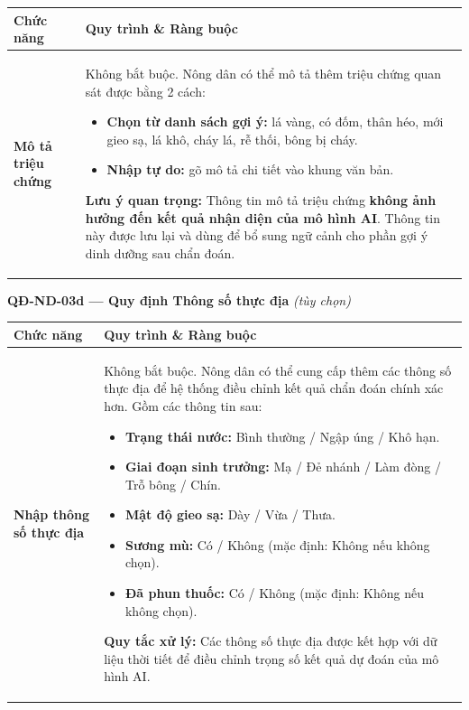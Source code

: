 \documentclass[12pt,a4paper]{article}
\begin{document}
\begin{longtable}{|
        >{\raggedright\arraybackslash}p{2.8cm}|
        >{\raggedright\arraybackslash}p{12cm}|}
    \hline
    \rowcolor{headerblue}
    \textbf{Chức năng}         & \textbf{Quy trình \& Ràng buộc}                                                                                                                                                          \\
    \hline
    \endhead
    \textbf{Mô tả triệu chứng} &
    Không bắt buộc. Nông dân có thể mô tả thêm triệu chứng quan sát được bằng 2 cách:
    \begin{itemize}[leftmargin=*,topsep=2pt,itemsep=1pt]
        \item \textbf{Chọn từ danh sách gợi ý:} lá vàng, có đốm, thân héo, mới gieo sạ, lá khô, cháy lá, rễ thối, bông bị cháy.
        \item \textbf{Nhập tự do:} gõ mô tả chi tiết vào khung văn bản.
    \end{itemize}
    \textbf{Lưu ý quan trọng:} Thông tin mô tả triệu chứng \textbf{không ảnh hưởng đến kết quả nhận diện của mô hình AI}. Thông tin này được lưu lại và dùng để bổ sung ngữ cảnh cho phần gợi ý dinh dưỡng sau chẩn đoán. \\
    \hline
\end{longtable}

\vspace{0.3cm}
\noindent\textbf{QĐ-ND-03d --- Quy định Thông số thực địa} \textit{(tùy chọn)}

\begin{longtable}{|
        >{\raggedright\arraybackslash}p{2.8cm}|
        >{\raggedright\arraybackslash}p{12cm}|}
    \hline
    \rowcolor{headerblue}
    \textbf{Chức năng}              & \textbf{Quy trình \& Ràng buộc}                                                                       \\
    \hline
    \endhead
    \textbf{Nhập thông số thực địa} &
    Không bắt buộc. Nông dân có thể cung cấp thêm các thông số thực địa để hệ thống điều chỉnh kết quả chẩn đoán chính xác hơn. Gồm các thông tin sau:
    \begin{itemize}[leftmargin=*,topsep=2pt,itemsep=1pt]
        \item \textbf{Trạng thái nước:} Bình thường / Ngập úng / Khô hạn.
        \item \textbf{Giai đoạn sinh trưởng:} Mạ / Đẻ nhánh / Làm đòng / Trỗ bông / Chín.
        \item \textbf{Mật độ gieo sạ:} Dày / Vừa / Thưa.
        \item \textbf{Sương mù:} Có / Không (mặc định: Không nếu không chọn).
        \item \textbf{Đã phun thuốc:} Có / Không (mặc định: Không nếu không chọn).
    \end{itemize}
    \textbf{Quy tắc xử lý:} Các thông số thực địa được kết hợp với dữ liệu thời tiết để điều chỉnh trọng số kết quả dự đoán của mô hình AI. \\
    \hline
\end{longtable}
\end{document}

